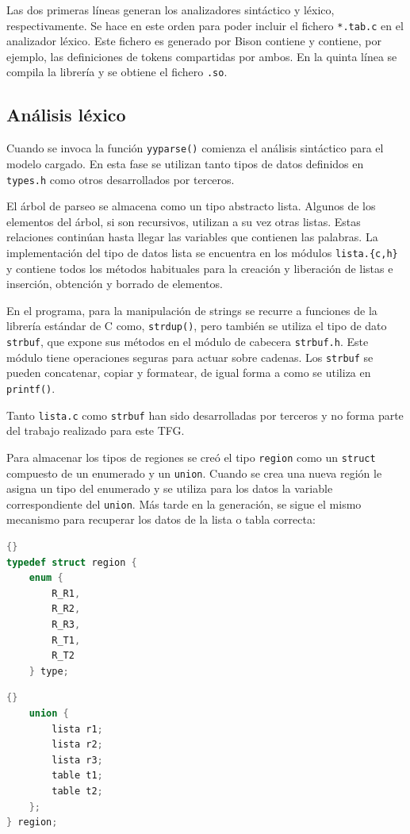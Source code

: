 Las dos primeras líneas generan los analizadores sintáctico y léxico, respectivamente. Se hace en este orden para poder incluir el fichero \verb|*.tab.c| en el analizador léxico. Este fichero es generado por Bison contiene y contiene, por ejemplo, las definiciones de tokens compartidas por ambos. En la quinta línea se compila la librería y se obtiene el fichero \verb|.so|.

\subsection{Análisis léxico}

Cuando se invoca la función \verb|yyparse()| comienza el análisis sintáctico para el modelo cargado. En esta fase se utilizan tanto tipos de datos definidos en \verb|types.h| como otros desarrollados por terceros. 

El árbol de parseo se almacena como un tipo abstracto lista. Algunos de los elementos del árbol, si son recursivos, utilizan a su vez otras listas. Estas relaciones continúan hasta llegar las variables que contienen las palabras. La implementación del tipo de datos lista se encuentra en los módulos \verb|lista.{c,h}| y contiene todos los métodos habituales para la creación y liberación de listas e inserción, obtención y borrado de elementos. 

En el programa, para la manipulación de strings se recurre a funciones de la librería estándar de C como, \verb|strdup()|, pero también se utiliza el tipo de dato \verb|strbuf|, que expone sus métodos en el módulo de cabecera \verb|strbuf.h|. Este módulo tiene operaciones seguras para actuar sobre cadenas. Los \verb|strbuf| se pueden concatenar, copiar y formatear, de igual forma a como se utiliza en \verb|printf()|.

Tanto \verb|lista.c| como \verb|strbuf| han sido desarrolladas por terceros y no forma parte del trabajo realizado para este TFG.

Para almacenar los tipos de regiones se creó el tipo \verb|region| como un \verb|struct| compuesto de un enumerado y un \verb|union|. Cuando se crea una nueva región le asigna un tipo del enumerado y se utiliza para los datos la variable correspondiente del \verb|union|. Más tarde en la generación, se sigue el mismo mecanismo para recuperar los datos de la lista o tabla correcta:

\noindent\begin{minipage}{.45\textwidth}
    \begin{lstlisting}[language=C,caption={},label={}]{}
typedef struct region {
    enum {
        R_R1,
        R_R2,
        R_R3,
        R_T1,
        R_T2
    } type;
    \end{lstlisting}
\end{minipage}\hfill
\begin{minipage}{.45\textwidth}
    \begin{lstlisting}[language=C,caption={},label={}]{}
    union {
        lista r1;
        lista r2;
        lista r3;
        table t1;
        table t2;
    };
} region;
    \end{lstlisting}
\end{minipage}

